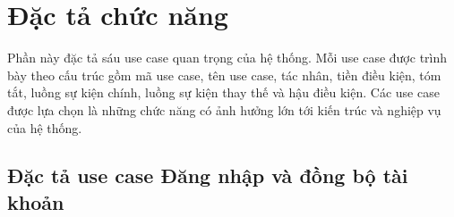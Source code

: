 \clearpage
\section{Đặc tả chức năng}
\label{section:2.3}

Phần này đặc tả sáu use case quan trọng của hệ thống. Mỗi use case được trình bày theo cấu trúc gồm mã use case, tên use case, tác nhân, tiền điều kiện, tóm tắt, luồng sự kiện chính, luồng sự kiện thay thế và hậu điều kiện. Các use case được lựa chọn là những chức năng có ảnh hưởng lớn tới kiến trúc và nghiệp vụ của hệ thống.

\subsection{Đặc tả use case Đăng nhập và đồng bộ tài khoản}
\label{subsection:2.3.1}

